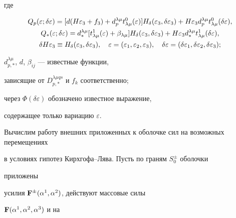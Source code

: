 где 


\begin{gather} 


Q_p(\varepsilon;\delta\varepsilon)=[d(H\varepsilon_3+f_3)+ 


d^{\lambda\mu}_p t^0_{\lambda\mu}(\varepsilon)]H_\delta 


(\varepsilon_3,\delta\varepsilon_3)+H\varepsilon_3


d^{\lambda\mu}_p t^0_{\lambda\mu}(\delta\varepsilon), \\ 


%


Q_*(\varepsilon;\delta\varepsilon)=d^{\lambda\mu}_* 


[t^1_{\lambda\mu}(\varepsilon)+\beta_{\lambda\mu}]H_\delta 


(\varepsilon_3,\delta\varepsilon_3)+H\varepsilon_3 


d^{\lambda\mu}_* t^1_{\lambda\mu}(\delta\varepsilon), \\ 


%


\delta H\varepsilon_3\equiv H_\delta(\varepsilon_3, 


\delta\varepsilon_3),\quad 


\varepsilon=(\varepsilon_1,\varepsilon_2,\varepsilon_3),\quad 


\delta\varepsilon=(\delta\varepsilon_1,\delta\varepsilon_2, 


\delta\varepsilon_3); \notag


\end{gather} 


$d^{\lambda\mu}_{p,*}$, $d$, $\beta_{ij}$ --- известные функции, 


зависящие от $D^{\lambda\mu qs}_{p,*}$ и $f_k$ соответственно; 


через $\Phi(\delta\varepsilon)$ обозначено известное выражение, 


содержащее только вариацию $\varepsilon$. 


 


Вычислим работу внешних приложенных к оболочке сил на возможных перемещениях


в условиях гипотез Кирхгофа--Лява. Пусть по граням $S^\pm_0$ оболочки 


приложены 


усилия $\bold F^\pm(\alpha^1,\alpha^2)$, действуют массовые силы 


$\bold F(\alpha^1,\alpha^2,\alpha^3)$ и на 


